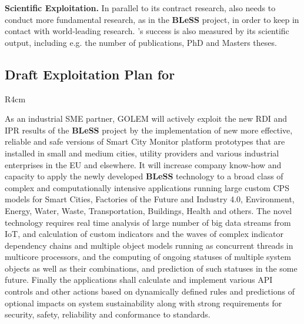 \documentclass[a4paper,11pt]{article}
\newcommand{\project}[1]{\textbf{#1}\xspace}
\newcommand{\BLESS}{\project{BLeSS}}
\newcommand{\TheProject}{\BLESS}
\begin{document}
\textbf{Scientific Exploitation.} In parallel to its contract research, \SCCHshort{} also needs to conduct more fundamental research,
as in the \TheProject{} project, in order to keep in contact with world-leading research. \SCCHshort{}'s success
is also measured by its scientific output, including e.g. the number of publications, PhD and Masters theses.

\horizontalline

\subsection*{Draft Exploitation Plan for \GOLEMshort{}}

\begin{wrapfigure}{R}{4cm}
\vspace{-1.4cm}
\hfill {}
\vspace{-0.8cm}
\end{wrapfigure}

As an industrial SME partner, GOLEM will actively exploit the new RDI and IPR results of the \TheProject project by the implementation of new more effective, reliable and safe versions of Smart City Monitor platform prototypes that are installed in small and medium cities, utility providers and various industrial enterprises in the EU and elsewhere. It will increase company know-how and capacity to apply the newly developed \TheProject technology to a broad class of complex and computationally intensive applications running large custom CPS models for Smart Cities, Factories of the Future and Industry 4.0, Environment, Energy, Water, Waste, Transportation, Buildings, Health and others. The novel technology requires real time analysis of large number of big data streams from IoT, and calculation of custom indicators and the waves of complex indicator dependency chains and multiple object models running as concurrent threads in multicore processors, and the computing of ongoing statuses of multiple system objects as well as their combinations, and prediction of such statuses in the some future. Finally the applications shall calculate and implement various API controls and other actions based on dynamically defined rules and predictions of optional impacts on system sustainability along with strong requirements for security, safety, reliability and conformance to standards. 
\end{document}
